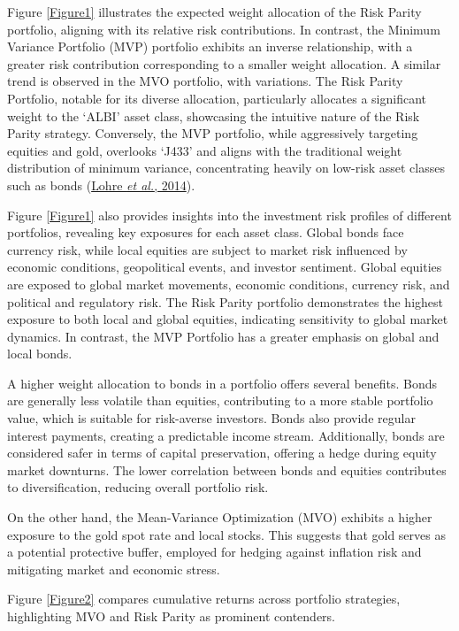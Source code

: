 \documentclass[12pt,preprint, authoryear]{elsarticle}
\numberwithin{equation}{section}
\numberwithin{figure}{section}
\numberwithin{table}{section}
\begin{document}
Figure \ref{Figure1} illustrates the expected weight allocation of the
Risk Parity portfolio, aligning with its relative risk contributions. In
contrast, the Minimum Variance Portfolio (MVP) portfolio exhibits an
inverse relationship, with a greater risk contribution corresponding to
a smaller weight allocation. A similar trend is observed in the MVO
portfolio, with variations. The Risk Parity Portfolio, notable for its
diverse allocation, particularly allocates a significant weight to the
`ALBI' asset class, showcasing the intuitive nature of the Risk Parity
strategy. Conversely, the MVP portfolio, while aggressively targeting
equities and gold, overlooks `J433' and aligns with the traditional
weight distribution of minimum variance, concentrating heavily on
low-risk asset classes such as bonds
(\protect\hyperlink{ref-lohre2014diversifying}{Lohre \emph{et al.},
2014}).

Figure \ref{Figure1} also provides insights into the investment risk
profiles of different portfolios, revealing key exposures for each asset
class. Global bonds face currency risk, while local equities are subject
to market risk influenced by economic conditions, geopolitical events,
and investor sentiment. Global equities are exposed to global market
movements, economic conditions, currency risk, and political and
regulatory risk. The Risk Parity portfolio demonstrates the highest
exposure to both local and global equities, indicating sensitivity to
global market dynamics. In contrast, the MVP Portfolio has a greater
emphasis on global and local bonds.

A higher weight allocation to bonds in a portfolio offers several
benefits. Bonds are generally less volatile than equities, contributing
to a more stable portfolio value, which is suitable for risk-averse
investors. Bonds also provide regular interest payments, creating a
predictable income stream. Additionally, bonds are considered safer in
terms of capital preservation, offering a hedge during equity market
downturns. The lower correlation between bonds and equities contributes
to diversification, reducing overall portfolio risk.

On the other hand, the Mean-Variance Optimization (MVO) exhibits a
higher exposure to the gold spot rate and local stocks. This suggests
that gold serves as a potential protective buffer, employed for hedging
against inflation risk and mitigating market and economic stress.

Figure \ref{Figure2} compares cumulative returns across portfolio
strategies, highlighting MVO and Risk Parity as prominent contenders.
\end{document}
